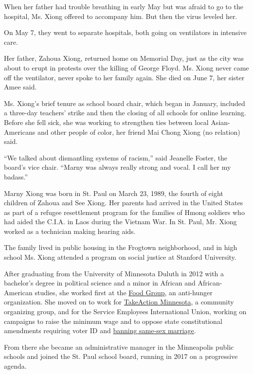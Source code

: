 When her father had trouble breathing in early May but was afraid to go
to the hospital, Ms. Xiong offered to accompany him. But then the virus
leveled her.

On May 7, they went to separate hospitals, both going on ventilators in
intensive care.

Her father, Zahoua Xiong, returned home on Memorial Day, just as the
city was about to erupt in protests over the killing of George Floyd.
Ms. Xiong never came off the ventilator, never spoke to her family
again. She died on June 7, her sister Amee said.

Ms. Xiong's brief tenure as school board chair, which began in January,
included a three-day teachers' strike and then the closing of all
schools for online learning. Before she fell sick, she was working to
strengthen ties between local Asian-Americans and other people of color,
her friend Mai Chong Xiong (no relation) said.

``We talked about dismantling systems of racism,'' said Jeanelle Foster,
the board's vice chair. ``Marny was always really strong and vocal. I
call her my badass.''

Marny Xiong was born in St. Paul on March 23, 1989, the fourth of eight
children of Zahoua and See Xiong. Her parents had arrived in the United
States as part of a refugee resettlement program for the families of
Hmong soldiers who had aided the C.I.A. in Laos during the Vietnam War.
In St. Paul, Mr. Xiong worked as a technician making hearing aids.

The family lived in public housing in the Frogtown neighborhood, and in
high school Ms. Xiong attended a program on social justice at Stanford
University.

After graduating from the University of Minnesota Duluth in 2012 with a
bachelor's degree in political science and a minor in African and
African-American studies, she worked first at the
\href{https://thefoodgroupmn.org/}{Food Group}, an anti-hunger
organization. She moved on to work for
\href{https://takeactionminnesota.org/}{TakeAction Minnesota}, a
community organizing group, and for the Service Employees International
Union, working on campaigns to raise the minimum wage and to oppose
state constitutional amendments requiring voter ID and
\href{https://www.mprnews.org/story/2012/11/07/minnesota-voters-reject-marriage-amendment}{banning
same-sex marriage}.

From there she became an administrative manager in the Minneapolis
public schools and joined the St. Paul school board, running in 2017 on
a progressive agenda.

